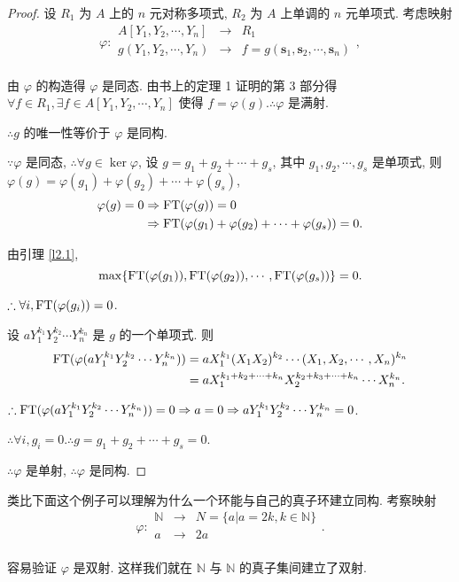 \documentclass[color=black,device=normal,lang=cn,mode=geye]{elegantnote}
\begin{document}
\begin{proof}
    设 $R_1$ 为 $A$ 上的 $n$ 元对称多项式, $R_2$ 为 $A$ 上单调的 $n$ 元单项式. 考虑映射
    \[\varphi:\begin{array}{rcl}
        A[Y_1,Y_2,\cdots,Y_n] & \to & R_1 \\
        g(Y_1,Y_2,\cdots,Y_n) & \to & f=g(\mathbf{s}_1,\mathbf{s}_2,\cdots,\mathbf{s}_n) \\
    \end{array},\]

    由 $\varphi$ 的构造得 $\varphi$ 是同态. 由书上的定理 1 证明的第 3 部分得 $\forall f\in R_1,\exists f\in A[Y_1,Y_2,\cdots,Y_n]$ 使得 $f=\varphi(g).\therefore\varphi$ 是满射.
    
    $\therefore g$ 的唯一性等价于 $\varphi$ 是同构.
    
    $\because\varphi$ 是同态, $\therefore\forall g\in\ker\varphi$, 设 $g=g_1+g_2+\cdots+g_s$, 其中 $g_1,g_2,\cdots,g_s$ 是单项式, 则 $\varphi(g)=\varphi(g_1)+\varphi(g_2)+\cdots+\varphi(g_s)$,
    \begin{align*}
        \varphi(g)=0 & \Rightarrow\operatorname{FT} (\varphi(g))=0 \\
        & \Rightarrow\operatorname{FT} (\varphi(g_1)+\varphi(g_2)+\cdots+\varphi(g_s))=0.
    \end{align*}

    由引理 \ref{l2.1},
    \[\max\{\operatorname{FT} (\varphi(g_1)),\operatorname{FT} (\varphi(g_2)),\cdots,\operatorname{FT} (\varphi(g_s))\}=0.\]

    $\therefore\forall i,\operatorname{FT} (\varphi(g_i))=0$.

    设 $aY^{k_1}_1Y^{k_2}_2\cdots Y^{k_n}_n$ 是 $g$ 的一个单项式. 则
    \begin{align*}
        \operatorname{FT} (\varphi(aY^{k_1}_1Y^{k_2}_2\cdots Y^{k_n}_n)) & =aX_1^{k_1}(X_1X_2)^{k_2}\cdots(X_1,X_2,\cdots,X_n)^{k_n} \\
        & =aX_1^{k_1+k_2+\cdots+k_n}X_2^{k_2+k_3+\cdots+k_n}\cdots X_n^{k_n}.
    \end{align*}

    $\therefore\operatorname{FT} (\varphi(aY^{k_1}_1Y^{k_2}_2\cdots Y^{k_n}_n))=0\Rightarrow a=0\Rightarrow aY^{k_1}_1Y^{k_2}_2\cdots Y^{k_n}_n=0$.

    $\therefore\forall i,g_i=0.\therefore g=g_1+g_2+\cdots+g_s=0$.

    $\therefore\varphi$ 是单射, $\therefore\varphi$ 是同构.
\end{proof}
\begin{note}
    类比下面这个例子可以理解为什么一个环能与自己的真子环建立同构. 考察映射
    \[\varphi:\begin{array}{rcl}
        \mathbb{N} & \to & N=\{a|a=2k,k\in\mathbb{N}\} \\
        a & \to & 2a \\
    \end{array}.\]

    容易验证 $\varphi$ 是双射. 这样我们就在 $\mathbb{N}$ 与 $\mathbb{N}$ 的真子集间建立了双射.
\end{note}
\end{document}
